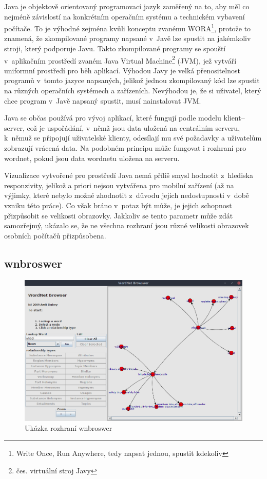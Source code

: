 \documentclass[a4paper,11pt,openany,twoside]{book}
\begin{document}
				Java je objektově orientovaný programovací jazyk zaměřený na to, aby měl co nejméně závislostí na konkrétním operačním systému a technickém vybavení počítače. To je výhodné zejména kvůli konceptu zvanému WORA\footnote{Write Once, Run Anywhere, tedy napsat jednou, spustit kdekoliv}, protože to znamená, že zkompilované programy napsané v~Javě lze spustit na jakémkoliv stroji, který podporuje Javu. Takto zkompilované programy se spouští v~aplikačním prostředí zvaném Java Virtual Machine\footnote{čes. virtuální stroj Javy} (JVM), jež vytváří uniformní prostředí pro běh aplikací. Výhodou Javy je velká přenositelnost programů v~tomto jazyce napsaných, jelikož jednou zkompilovaný kód lze spustit na různých operačních systémech a zařízeních. Nevýhodou je, že si uživatel, který chce program v~Javě napsaný spustit, musí nainstalovat JVM. 

				Java se občas používá pro vývoj aplikací, které fungují podle modelu klient--server, což je uspořádání, v~němž jsou data uložená na centrálním serveru, k~němuž se připojují uživatelské klienty, odesílají mu své požadavky a uživatelům zobrazují vrácená data. \parencite[13]{gosling1995java} Na podobném principu může fungovat i rozhraní pro wordnet, pokud jsou data wordnetu uložena na serveru.

				Vizualizace vytvořené pro prostředí Java nemá příliš smysl hodnotit z~hlediska responzivity, jelikož a priori nejsou vytvářena pro mobilní zařízení (až na výjimky, které nebylo možné zhodnotit z~důvodu jejich nedostupnosti v~době vzniku této práce). Co však bráno v~potaz být může, je jejich schopnost přizpůsobit se velikosti obrazovky. Jakkoliv se tento parametr může zdát samozřejmý, ukázalo se, že ne všechna rozhraní jsou různé velikosti obrazovek osobních počítačů přizpůsobena.

				\subsection{wnbroswer}

					\begin{figure}[h]
						\centering
						\includegraphics[width=1.0\textwidth]{wnwordnetbrowswer.png}
						\caption{Ukázka rozhraní wnbroswer}
						\label{fig:wnwordnetbrowswer}
					\end{figure}
\end{document}
